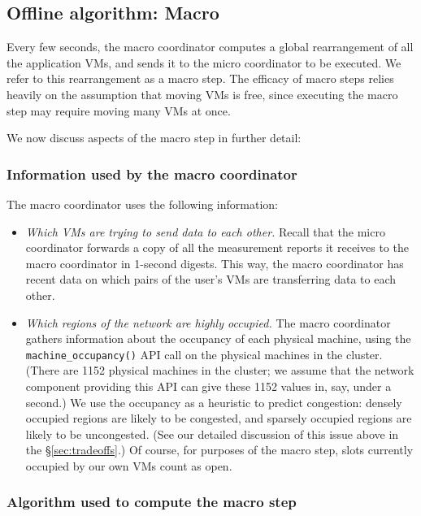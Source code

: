 \documentclass[11pt]{article}
\begin{document}
\FloatBarrier

\subsection{Offline algorithm: Macro}

Every few seconds, the macro coordinator computes a global rearrangement of all the application VMs, and sends it to the micro coordinator to be executed.  We refer to this rearrangement as a macro step.  The efficacy of macro steps relies heavily on the assumption that moving VMs is free, since executing the macro step may require moving many VMs at once.

We now discuss aspects of the macro step in further detail:

\subsubsection{Information used by the macro coordinator}

The macro coordinator uses the following information:

\begin{itemize}
  \item {\em Which VMs are trying to send data to each other.}  Recall that the micro coordinator forwards a copy of all the measurement reports it receives to the macro coordinator in 1-second digests.  This way, the macro coordinator has recent data on which pairs of the user's VMs are transferring data to each other.
    
  \item {\em Which regions of the network are highly occupied.}  The macro coordinator gathers information about the occupancy of each physical machine, using the \texttt{machine\_occupancy()} API call on the physical machines in the cluster.  (There are 1152 physical machines in the cluster; we assume that the network component providing this API can give these 1152 values in, say, under a second.)   We use the occupancy as a heuristic to predict congestion: densely occupied regions are likely to be congested, and sparsely occupied regions are likely to be uncongested.  (See our detailed discussion of this issue above in the \S\ref{sec:tradeoffs}.)  Of course, for purposes of the macro step, slots currently occupied by our own VMs count as open.
\end{itemize}

\subsubsection{Algorithm used to compute the macro step}
\end{document}
